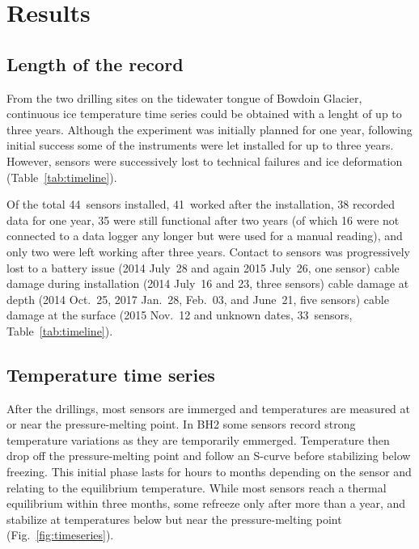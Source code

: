\documentclass[utf8]{article}
\begin{document}
\section{Results}

\subsection{Length of the record}

    From the two drilling sites on the tidewater tongue of Bowdoin Glacier,
    continuous ice temperature time series could be obtained with a lenght of
    up to three years. Although the experiment was initially planned for one
    year, following initial success some of the instruments were let installed
    for up to three years. However, sensors were successively lost to technical
    failures and ice deformation (Table~\ref{tab:timeline}).

    Of the total 44~sensors installed, 41~worked after the installation, 38
    recorded data for one year, 35 were still functional after two years (of
    which 16 were not connected to a data logger any longer but were used for a
    manual reading), and only two were left
    working after three years. Contact to sensors was progressively lost to a
    battery issue (2014 July~28 and again 2015 July~26, one sensor) cable
    damage during installation (2014 July~16 and 23, three sensors) cable
    damage at depth (2014 Oct.~25, 2017 Jan.~28, Feb.~03, and June~21, five
    sensors) cable damage at the surface (2015 Nov.~12 and unknown dates,
    33~sensors, Table~\ref{tab:timeline}).


\subsection{Temperature time series}

    After the drillings, most sensors are immerged and temperatures are
    measured at or near the pressure-melting point. In BH2 some sensors record
    strong temperature variations as they are temporarily emmerged. Temperature
    then drop off the pressure-melting point and follow an S-curve before
    stabilizing below freezing. This initial phase lasts for hours to months
    depending on the sensor and relating to the equilibrium temperature. While
    most sensors reach a thermal equilibrium within three months, some refreeze
    only after more than a year, and stabilize at temperatures below but near
    the pressure-melting point (Fig.~\ref{fig:timeseries}).
\end{document}
